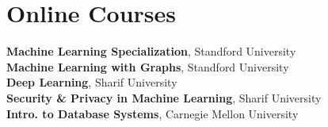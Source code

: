 
\section{Online Courses}
\textbf{Machine Learning Specialization}, Standford University \\
\textbf{Machine Learning with Graphs}, Standford University \\
\textbf{Deep Learning}, Sharif University \\
\textbf{Security \& Privacy in Machine Learning}, Sharif University \\
\textbf{Intro. to Database Systems}, Carnegie Mellon University 

